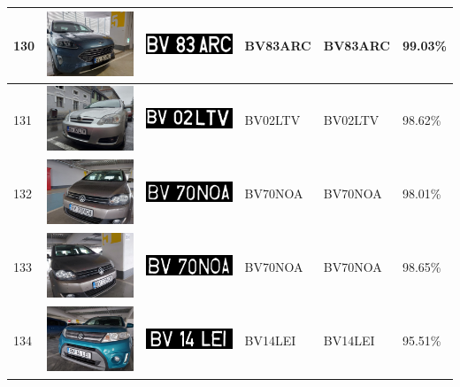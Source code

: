 \documentclass[a4paper,12pt]{report}
\begin{document}
\begin{longtable}{| m{0.6cm} | m{3cm} | m{3cm} | m{1.8cm} | m{1.8cm} | m{1.8cm} |}
        130 & \includegraphics[width=3cm,keepaspectratio]{dataset/76_s1.jpg} & \includegraphics[width=3cm,keepaspectratio]{segmentari/130.jpg} & BV83ARC & BV83ARC & 99.03\% \\ \hline
        131 & \includegraphics[width=3cm,keepaspectratio]{dataset/77_d1.jpg} & \includegraphics[width=3cm,keepaspectratio]{segmentari/131.jpg} & BV02LTV & BV02LTV & 98.62\% \\ \hline
        132 & \includegraphics[width=3cm,keepaspectratio]{dataset/78_d1.jpg} & \includegraphics[width=3cm,keepaspectratio]{segmentari/132.jpg} & BV70NOA & BV70NOA & 98.01\% \\ \hline
        133 & \includegraphics[width=3cm,keepaspectratio]{dataset/78_s1.jpg} & \includegraphics[width=3cm,keepaspectratio]{segmentari/133.jpg} & BV70NOA & BV70NOA & 98.65\% \\ \hline
        134 & \includegraphics[width=3cm,keepaspectratio]{dataset/79_d1.jpg} & \includegraphics[width=3cm,keepaspectratio]{segmentari/134.jpg} & BV14LEI & BV14LEI & 95.51\% \\ \hline

\end{longtable}
\end{document}

